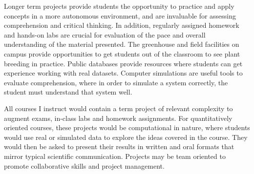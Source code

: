 \documentclass[11pt]{article}
\begin{document}

Longer term projects provide students the opportunity to practice and apply concepts in a more autonomous environment, and are invaluable for assessing comprehension and critical thinking. In addition, regularly assigned homework and hands-on labs are crucial for evaluation of the pace and overall understanding of the material presented. The greenhouse and field facilities on campus provide opportunities to get students out of the classroom to see plant breeding in practice. Public databases provide resources where students can get experience working with real datasets. Computer simulations are useful tools to evaluate comprehension, where in order to simulate a system correctly, the student must understand that system well.

All courses I instruct would contain a term project of relevant complexity to augment exams, in-class labs and homework assignments. For quantitatively oriented courses, these projects would be computational in nature, where students would use real or simulated data to explore the ideas covered in the course. They would then be asked to present their results in written and oral formats that mirror typical scientific communication. Projects may be team oriented to promote collaborative skills and project management. %

\end{document}
